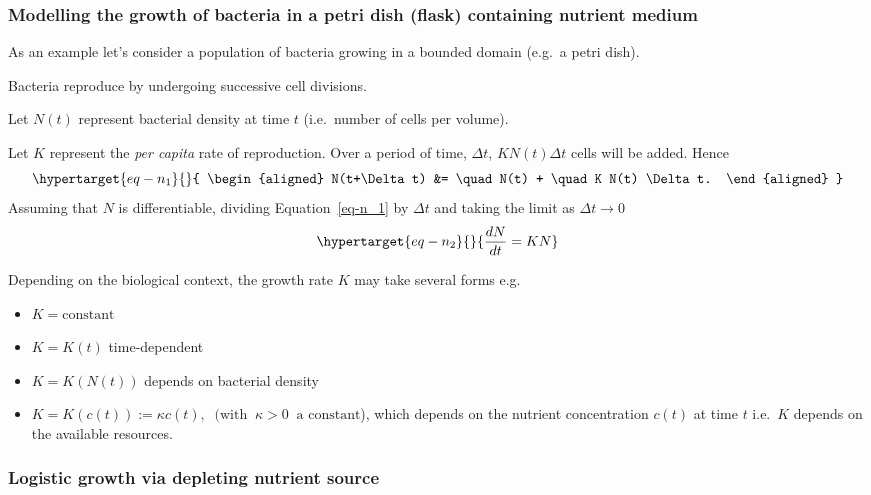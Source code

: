 \documentclass[
  letterpaper,
  DIV=11,
  numbers=noendperiod]{scrreprt}
\providecommand{\tightlist}{%
  \setlength{\itemsep}{0pt}\setlength{\parskip}{0pt}}\usepackage{longtable,booktabs,array}
\theoremstyle{definition}
\theoremstyle{plain}
\theoremstyle{plain}
\theoremstyle{remark}
\begin{document}
\hypertarget{modelling-the-growth-of-bacteria-in-a-petri-dish-flask-containing-nutrient-medium}{%
\subsubsection{Modelling the growth of bacteria in a petri dish (flask)
containing nutrient
medium}\label{modelling-the-growth-of-bacteria-in-a-petri-dish-flask-containing-nutrient-medium}}

As an example let's consider a population of bacteria growing in a
bounded domain (e.g.~a petri dish).

Bacteria reproduce by undergoing successive cell divisions.

Let \(N(t)\) represent bacterial density at time \(t\) (i.e.~number of
cells per volume).

Let \(K\) represent the \emph{per capita} rate of reproduction. Over a
period of time, \(\Delta t\), \(K N(t) \Delta t\) cells will be added.
Hence \begin{equation}\protect\hypertarget{eq-n_1}{}{ 
\begin{aligned}
N(t+\Delta t) &=  \quad N(t)   + \quad  K N(t) \Delta t.
\end{aligned}
}\label{eq-n_1}\end{equation} Assuming that \(N\) is differentiable,
dividing Equation~\ref{eq-n_1} by \(\Delta t\) and taking the limit as
\(\Delta t \to 0\) \begin{equation}\protect\hypertarget{eq-n_2}{}{
 \frac{dN}{dt} = K N 
}\label{eq-n_2}\end{equation}

Depending on the biological context, the growth rate \(K\) may take
several forms e.g.~

\begin{itemize}
\tightlist
\item
  \(K = \textrm{constant}\)
\item
  \(K = K(t)\) \qquad  time-dependent
\item
  \(K= K(N(t))\) \qquad depends on bacterial density
\item
  \(K= K(c(t)):= \kappa c(t), \;\; (\text{with} \;\; \kappa >0 \;\; \text{a constant}\)),
  which depends on the nutrient concentration \(c(t)\) at time \(t\)
  i.e.~\(K\) depends on the available resources.
\end{itemize}

\hypertarget{logistic-growth-via-depleting-nutrient-source}{%
\subsubsection{Logistic growth via depleting nutrient
source}\label{logistic-growth-via-depleting-nutrient-source}}
\end{document}
